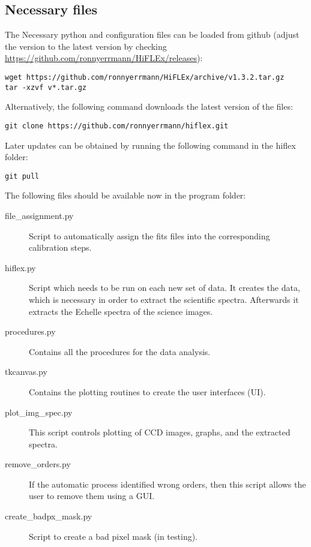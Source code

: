 \documentclass[10pt,a4paper]{article}
\begin{document}
\subsection{Necessary files}

\noindent The Necessary python and configuration files can be loaded from github (adjust the version to the latest version by checking \url{https://github.com/ronnyerrmann/HiFLEx/releases}):
\begin{lstlisting}[style=base]
wget https://github.com/ronnyerrmann/HiFLEx/archive/v1.3.2.tar.gz
tar -xzvf v*.tar.gz
\end{lstlisting}
Alternatively, the following command downloads the latest version of the files:
\begin{lstlisting}[style=base]
git clone https://github.com/ronnyerrmann/hiflex.git
\end{lstlisting}
Later updates can be obtained by running the following command in the hiflex folder:
\begin{lstlisting}[style=base]
git pull
\end{lstlisting}


\noindent The following files should be available now in the program folder:
\begin{description}
 \item[file\_assignment.py] Script to automatically assign the fits files into the corresponding calibration steps.
 \item[hiflex.py] Script which needs to be run on each new set of data. It creates the data, which is necessary in order to extract the scientific spectra. Afterwards it extracts the Echelle spectra of the science images.
 \item[procedures.py] Contains all the procedures for the data analysis.
 \item[tkcanvas.py] Contains the plotting routines to create the user interfaces (UI).
 \item[plot\_img\_spec.py] This script controls plotting of CCD images, graphs, and the extracted spectra.
 \item[remove\_orders.py] If the automatic process identified wrong orders, then this script allows the user to remove them using a GUI.
 \item[create\_badpx\_mask.py] Script to create a bad pixel mask (in testing).
\end{description}
\end{document}
